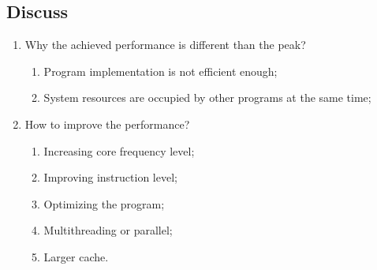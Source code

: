 \documentclass{article}
\begin{document}
\newpage
\subsection{Discuss}
\begin{enumerate}
\item Why the achieved performance is different than the peak?
    \begin{enumerate}
        \item Program implementation is not efficient enough;
        \item System resources are occupied by other programs at the same time;
    \end{enumerate}
\item How to improve the performance?
    \begin{enumerate}
        \item Increasing core frequency level;
        \item Improving instruction level;
        \item Optimizing the program;
        \item Multithreading or parallel;
        \item Larger cache.
    \end{enumerate}
\end{enumerate}
\end{document}
